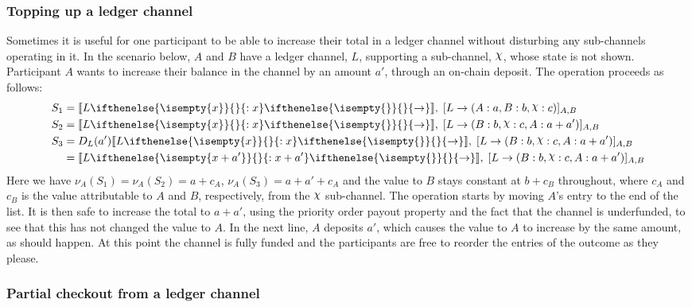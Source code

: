 \documentclass{article}
\DeclareRobustCommand{\rchi}{{\mathpalette\irchi\relax}}
\newcommand{\irchi}[2]{\raisebox{\depth}{$#1\chi$}} %
\theoremstyle{definition}
\newcommand{\adj}[1]{\llbracket #1 \rrbracket}
\newcommand{\holds}[3]{#1 %
  \ifthenelse{\isempty{#2}}{}{: #2} %
  \ifthenelse{\isempty{#3}}{}{\rightarrow #3} %
}
\newcommand{\alloc}[1]{( #1 )}
\newcommand{\finalizable}[3]{[#1 \rightarrow #2]_{#3}}
\begin{document}
\subsubsection{Topping up a ledger channel}

Sometimes it is useful for one participant to be able to increase their total in a ledger channel without disturbing any sub-channels operating in it.
In the scenario below, $A$ and $B$ have a ledger channel, $L$, supporting a sub-channel, $\rchi$, whose state is not shown.
Participant $A$ wants to increase their balance in the channel by an amount $a'$, through an on-chain deposit.
The operation proceeds as follows:
\begin{align*}
S_1 &= \adj{\holds{L}{x}{}}, \; \finalizable{L}{\alloc{A:a, B:b, \rchi: c}}{A, B} \\
S_2 &= \adj{\holds{L}{x}{}}, \; \finalizable{L}{\alloc{B: b, \rchi: c, A: a + a'}}{A, B} \\
S_3 &= D_L(a')\adj{\holds{L}{x}{}}, \; \finalizable{L}{\alloc{B: b, \rchi: c, A: a + a'}}{A, B} \\
    &= \adj{\holds{L}{x + a'}{}}, \; \finalizable{L}{\alloc{B: b, \rchi: c, A: a + a'}}{A, B}
\end{align*}
Here we have $\nu_A(S_1) = \nu_A(S_2) = a + c_A$, $\nu_A(S_3) = a + a' + c_A$ and the value to $B$ stays constant at $b + c_B$ throughout, where $c_A$ and $c_B$ is the value attributable to $A$ and $B$, respectively, from the $\rchi$ sub-channel.
The operation starts by moving $A$'s entry to the end of the list.
It is then safe to increase the total to $a + a'$, using the priority order payout property and the fact that the channel is underfunded, to see that this has not changed the value to $A$.
In the next line, $A$ deposits $a'$, which causes the value to $A$ to increase by the same amount, as should happen.
At this point the channel is fully funded and the participants are free to reorder the entries of the outcome as they please.

\subsubsection{Partial checkout from a ledger channel}
\end{document}
